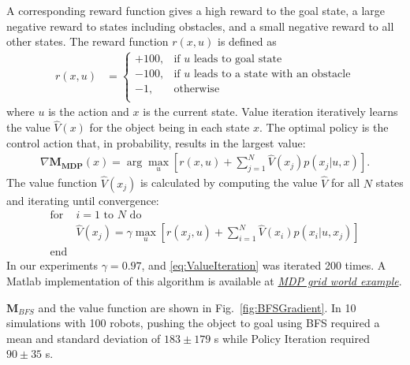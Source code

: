  A corresponding reward function gives a high reward to the goal state,  
 a large negative reward to states including obstacles, and a small negative reward to all other states.
The reward function $r(x,u)$ is defined as
\begin{align}
r(x,u) &=  \left\{
\begin{array}{ll}
     +100, &  \textrm{if } u \textrm{ leads to goal state}\\
      -100, & \textrm{if } u \textrm{ leads to a state with an obstacle} \\
      -1, & \textrm{otherwise}\\
\end{array} 
\right.
\end{align}
where $u$ is the action and $x$ is the current state. 
  Value iteration iteratively learns the value $\hat{V}(x)$ for the object being in each state $x$. The optimal policy is the control action that, in probability, results in the largest value:
   \begin{align} \nabla \mathbf{M_{MDP}}(x) = \arg\max_u   [ r(x,u) + \sum\limits_{j=1}^N \hat{V}(x_j) p(x_j| u,x)].  \label{eq:OptimalPolicy}
   \end{align}
   The value function $\hat{V}(x_j) $ is calculated by computing the value $\hat{V}$ for all $N$ states and iterating until convergence:
\begin{align}
\text{for }&\text{$i=1$ to $N$ do} \nonumber \\
&\hat{V} (x_j) = \gamma \max_u [r(x_j,u) + \sum\limits_{i=1}^N \hat{V}(x_i) p(x_i| u,x_j)] \label{eq:ValueIteration}\\
\text{end}& \nonumber
\end{align}
In our experiments $\gamma = 0.97$, and \eqref{eq:ValueIteration} was iterated 200 times. A {\sc Matlab} implementation of this algorithm is available at \href{https://www.mathworks.com/matlabcentral/fileexchange/49992-mdp-robot-grid-world-example}{\emph{MDP grid world example}}.%

$\mathbf{M}_{BFS}$ and the value function are shown in Fig.~\ref{fig:BFSGradient}. 
In 10 simulations with 100 robots, pushing the object to goal using BFS required a mean and standard deviation of $183\pm 179$ s while Policy Iteration required $90\pm 35$ s.

